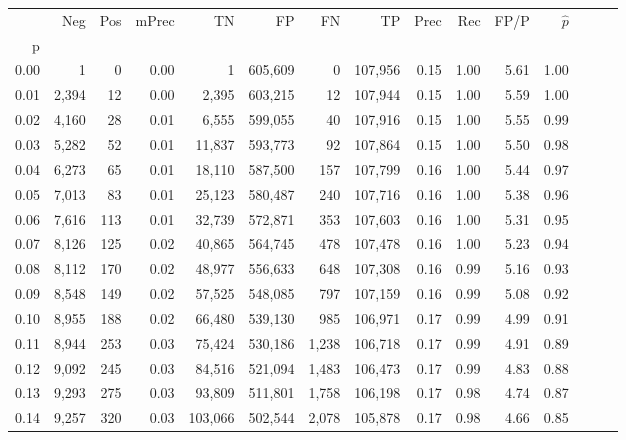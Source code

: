 \begin{tabular}{rrrrrrrrrrrrrrr}
\toprule
{} &    Neg &    Pos & mPrec &       TN &       FP &       FN &       TP &  Prec &   Rec &  FP/P & $\hat{p}$ \\
p    &        &        &       &          &          &          &          &       &       &       &           \\
\midrule
0.00 &      1 &      0 &  0.00 &        1 &  605,609 &        0 &  107,956 &  0.15 &  1.00 &  5.61 &      1.00 \\
0.01 &  2,394 &     12 &  0.00 &    2,395 &  603,215 &       12 &  107,944 &  0.15 &  1.00 &  5.59 &      1.00 \\
0.02 &  4,160 &     28 &  0.01 &    6,555 &  599,055 &       40 &  107,916 &  0.15 &  1.00 &  5.55 &      0.99 \\
0.03 &  5,282 &     52 &  0.01 &   11,837 &  593,773 &       92 &  107,864 &  0.15 &  1.00 &  5.50 &      0.98 \\
0.04 &  6,273 &     65 &  0.01 &   18,110 &  587,500 &      157 &  107,799 &  0.16 &  1.00 &  5.44 &      0.97 \\
0.05 &  7,013 &     83 &  0.01 &   25,123 &  580,487 &      240 &  107,716 &  0.16 &  1.00 &  5.38 &      0.96 \\
0.06 &  7,616 &    113 &  0.01 &   32,739 &  572,871 &      353 &  107,603 &  0.16 &  1.00 &  5.31 &      0.95 \\
0.07 &  8,126 &    125 &  0.02 &   40,865 &  564,745 &      478 &  107,478 &  0.16 &  1.00 &  5.23 &      0.94 \\
0.08 &  8,112 &    170 &  0.02 &   48,977 &  556,633 &      648 &  107,308 &  0.16 &  0.99 &  5.16 &      0.93 \\
0.09 &  8,548 &    149 &  0.02 &   57,525 &  548,085 &      797 &  107,159 &  0.16 &  0.99 &  5.08 &      0.92 \\
0.10 &  8,955 &    188 &  0.02 &   66,480 &  539,130 &      985 &  106,971 &  0.17 &  0.99 &  4.99 &      0.91 \\
0.11 &  8,944 &    253 &  0.03 &   75,424 &  530,186 &    1,238 &  106,718 &  0.17 &  0.99 &  4.91 &      0.89 \\
0.12 &  9,092 &    245 &  0.03 &   84,516 &  521,094 &    1,483 &  106,473 &  0.17 &  0.99 &  4.83 &      0.88 \\
0.13 &  9,293 &    275 &  0.03 &   93,809 &  511,801 &    1,758 &  106,198 &  0.17 &  0.98 &  4.74 &      0.87 \\
0.14 &  9,257 &    320 &  0.03 &  103,066 &  502,544 &    2,078 &  105,878 &  0.17 &  0.98 &  4.66 &      0.85 \\

\end{tabular}
